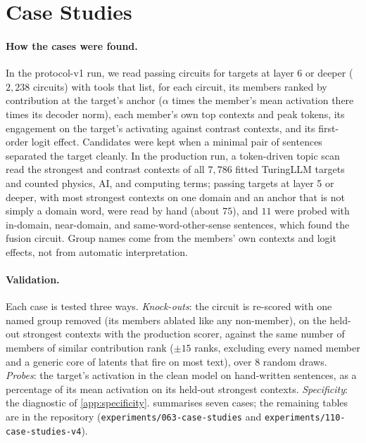 \documentclass[10pt]{article}
\begin{document}
\section{Case Studies}
\label{app:case-studies}

\paragraph{How the cases were found.}
In the protocol-v1 run, we read passing circuits for targets at layer 6 or deeper ($2{,}238$ circuits) with tools that list, for each circuit, its members ranked by contribution at the target's anchor ($\alpha$ times the member's mean activation there times its decoder norm), each member's own top contexts and peak tokens, its engagement on the target's activating against contrast contexts, and its first-order logit effect.
Candidates were kept when a minimal pair of sentences separated the target cleanly.
In the production run, a token-driven topic scan read the strongest and contrast contexts of all $7{,}786$ fitted TuringLLM targets and counted physics, AI, and computing terms; passing targets at layer 5 or deeper, with most strongest contexts on one domain and an anchor that is not simply a domain word, were read by hand (about $75$), and $11$ were probed with in-domain, near-domain, and same-word-other-sense sentences, which found the fusion circuit.
Group names come from the members' own contexts and logit effects, not from automatic interpretation.

\paragraph{Validation.}
Each case is tested three ways.
\emph{Knock-outs}: the circuit is re-scored with one named group removed (its members ablated like any non-member), on the held-out strongest contexts with the production scorer, against the same number of members of similar contribution rank ($\pm 15$ ranks, excluding every named member and a generic core of latents that fire on most text), over $8$ random draws.
\emph{Probes}: the target's activation in the clean model on hand-written sentences, as a percentage of its mean activation on its held-out strongest contexts.
\emph{Specificity}: the diagnostic of \cref{app:specificity}.
 summarises seven cases; the remaining tables are in the repository (\texttt{experiments/063-case-studies} and \texttt{experiments/110-case-studies-v4}).
\end{document}
